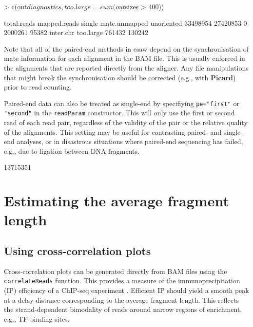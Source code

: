 \documentclass[12pt]{report}
\renewenvironment{Schunk}{\vspace{0pt}}{\vspace{0pt}}
\newcommand{\pkgname}{csaw}
\newcommand{\code}[1]{{\small\texttt{#1}}}
\begin{document}
\begin{Schunk}
\begin{Sinput}
> c(out$diagnostics, too.large=sum(out$sizes > 400))
\end{Sinput}
\begin{Soutput}
  total.reads  mapped.reads        single mate.unmapped    unoriented 
     33498954      27420853             0       2000261         95382 
    inter.chr     too.large 
       761432        130242 
\end{Soutput}
\end{Schunk}

Note that all of the paired-end methods in \pkgname{} depend on the synchronisation of mate information for each alignment in the BAM file. 
This is usually enforced in the alignments that are reported directly from the aligner. 
Any file manipulations that might break the synchronisation should be corrected (e.g., with \href{http://broadinstitute.github.io/picard}{\textbf{Picard}}) prior to read counting.

Paired-end data can also be treated as single-end by specifiying \code{pe="first"} or \code{"second"} in the \code{readParam} constructor. 
This will only use the first or second read of each read pair, regardless of the validity of the pair or the relative quality of the alignments.
This setting may be useful for contrasting paired- and single-end analyses, or in disastrous situations where paired-end sequencing has failed, e.g., due to ligation between DNA fragments.

\begin{Schunk}
\begin{Soutput}
[1] 13715351
\end{Soutput}
\end{Schunk}

\section{Estimating the average fragment length}
\label{sec:ccf}

\subsection{Using cross-correlation plots}
Cross-correlation plots can be generated directly from BAM files using the \code{correlateReads} function. 
This provides a measure of the immunoprecipitation (IP) efficiency of a ChIP-seq experiment \citep{kharchenko2008}. 
Efficient IP should yield a smooth peak at a delay distance corresponding to the average fragment length. 
This reflects the strand-dependent bimodality of reads around narrow regions of enrichment, e.g., TF binding sites. 
\end{document}
